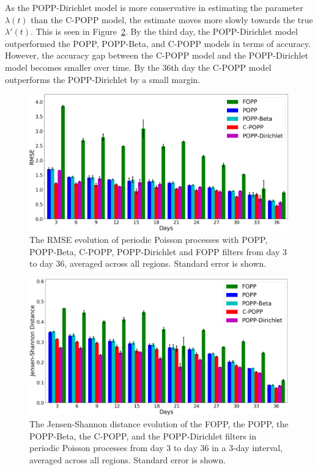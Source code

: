 As the POPP-Dirichlet model is more conservative in estimating the parameter $\lambda(t)$ than the C-POPP model, the estimate moves more slowly towards the true $\lambda'(t)$. This is seen in Figure~\ref{fig:fopp_popp_popb_npop_popd_kl_evo}.
By the third day, the POPP-Dirichlet model outperformed the POPP, POPP-Beta, and C-POPP models in terms of accuracy. However, the accuracy gap between the C-POPP model and the POPP-Dirichlet model becomes smaller over time. By the 36th day the C-POPP model outperforms the POPP-Dirichlet by a small margin.

\begin{figure}[t!]
	\centering
	\includegraphics[width=0.95\columnwidth]{./figures/fopp_popp_popb_npop_popd_rmse_evo.png}
	\caption{The RMSE evolution of periodic Poisson processes with POPP, POPP-Beta, C-POPP, POPP-Dirichlet and FOPP filters from day 3 to day 36, averaged across all regions. Standard error is shown.}
	\label{fig:fopp_popp_popb_npop_popd_rmse_evo}
\end{figure}

\begin{figure}[t!]
	\centering
	\includegraphics[width=0.95\columnwidth]{./figures/fopp_popp_popb_npop_popd_kl_evo.png}
	\caption{The Jensen-Shannon distance evolution of the FOPP, the POPP, the POPP-Beta, the C-POPP, and the POPP-Dirichlet filters in periodic Poisson processes from day 3 to day 36 in a 3-day interval, averaged across all regions. Standard error is shown.}
	\label{fig:fopp_popp_popb_npop_popd_kl_evo}
\end{figure}

